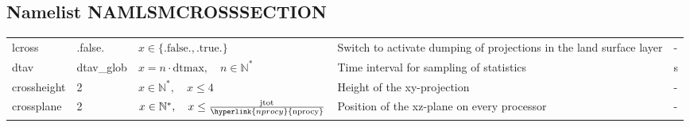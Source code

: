 \documentclass[twoside,11pt,fleqn,a4paper,english,openright]{report}
\begin{document}
\subsection{Namelist NAMLSMCROSSSECTION}\label{par:lsmcrosssection}
\begin{center}
  \tablelasttail{
        &&&&\\\hline
  }
\begin{supertabular}{|l|p{1.6cm}|p{4cm}|p{6cm}|l|}
  lcross	&	.false.	& $x\in\{\text{.false.},\text{.true.}\}$	& Switch to activate dumping of projections in the land surface layer & -\\
  dtav		& dtav\_glob	& $x = n \cdot \text{dtmax}, \quad n \in \mathbb{N}^*$	& Time interval for sampling of statistics	& s\\
  crossheight	& 2	& $x \in \mathbb{N}^*, \quad x \le 4$	& Height of the xy-projection & -\\
  crossplane	& 2	& $x \in \mathbb{N}^*, \quad x \le \frac{\text{jtot}}{\hyperlink{nprocy}{\text{nprocy}}}$	& Position of the xz-plane on every processor & -\\
\end{supertabular}
\end{center}
\end{document}
